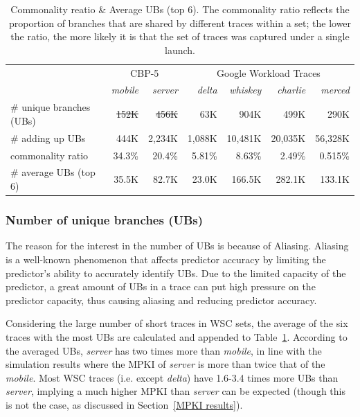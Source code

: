 \begin{table}[h!] 
\centering
\begin{tabular}{l r r r r r r}
\toprule{\LARGE}
\multirow{2}{*}{} & \multicolumn{2}{c}{CBP-5} & \multicolumn{4}{c}{Google Workload Traces} \\ 
\cmidrule{2-3} \cmidrule{4-7}
  & \textit{mobile} & \textit{server}  & \textit{delta} & \textit{whiskey} & \textit{charlie} & \textit{merced}  \\ 
\midrule
\# unique branches (UBs)     & \sout{152K}   & \sout{456K}  & 63K  & 904K  & 499K & 290K  \\

\# adding up UBs  & 444K   & 2,234K  & 1,088K  & 10,481K  & 20,035K  & 56,328K \\

commonality ratio         & 34.3\% & 20.4\%  & 5.81\% & 8.63\%  & 2.49\%  & 0.515\% \\

\# average UBs (top 6) & 35.5K & 82.7K & 23.0K & 166.5K & 282.1K & 133.1K \\

\bottomrule
\end{tabular}
\caption{\centering \small Commonality reatio \& Average UBs (top 6). The commonality ratio reflects the proportion of branches that are shared by different traces within a set; the lower the ratio, the more likely it is that the set of traces was captured under a single launch.}
\label{table:unite CBP}
\end{table} %

\subsubsection{Number of unique branches (UBs)}

The reason for the interest in the number of UBs is because of Aliasing. Aliasing is a well-known phenomenon that affects predictor accuracy by limiting the predictor's ability to accurately identify UBs. Due to the limited capacity of the predictor, a great amount of UBs in a trace can put high pressure on the predictor capacity, thus causing aliasing and reducing predictor accuracy.\par\hspace*{\fill}\par

Considering the large number of short traces in WSC sets, the average of the six traces with the most UBs are calculated and appended to Table~\ref{table:unite CBP}. According to the averaged UBs, \textit{server} has two times more than \textit{mobile}, in line with the simulation results where the MPKI of \textit{server} is more than twice that of the \textit{mobile}. Most WSC traces (i.e. except \textit{delta}) have 1.6-3.4 times more UBs than \textit{server}, implying a much higher MPKI than \textit{server} can be expected (though this is not the case, as discussed in Section~\ref{MPKI results}). \par\hspace*{\fill}\par

